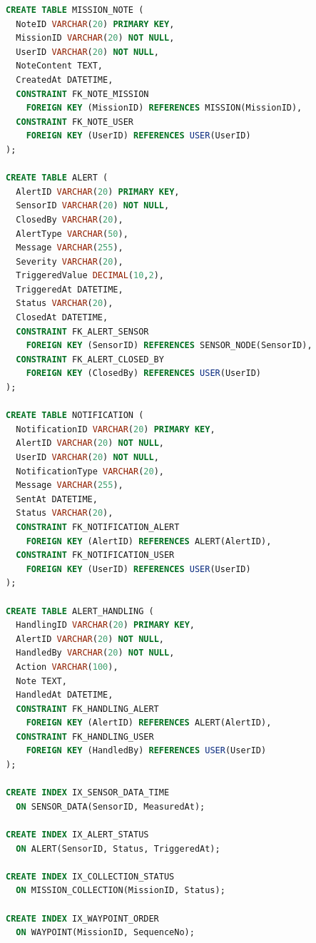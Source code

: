 \begin{lstlisting}[language=SQL]
CREATE TABLE MISSION_NOTE (
  NoteID VARCHAR(20) PRIMARY KEY,
  MissionID VARCHAR(20) NOT NULL,
  UserID VARCHAR(20) NOT NULL,
  NoteContent TEXT,
  CreatedAt DATETIME,
  CONSTRAINT FK_NOTE_MISSION
    FOREIGN KEY (MissionID) REFERENCES MISSION(MissionID),
  CONSTRAINT FK_NOTE_USER
    FOREIGN KEY (UserID) REFERENCES USER(UserID)
);

CREATE TABLE ALERT (
  AlertID VARCHAR(20) PRIMARY KEY,
  SensorID VARCHAR(20) NOT NULL,
  ClosedBy VARCHAR(20),
  AlertType VARCHAR(50),
  Message VARCHAR(255),
  Severity VARCHAR(20),
  TriggeredValue DECIMAL(10,2),
  TriggeredAt DATETIME,
  Status VARCHAR(20),
  ClosedAt DATETIME,
  CONSTRAINT FK_ALERT_SENSOR
    FOREIGN KEY (SensorID) REFERENCES SENSOR_NODE(SensorID),
  CONSTRAINT FK_ALERT_CLOSED_BY
    FOREIGN KEY (ClosedBy) REFERENCES USER(UserID)
);

CREATE TABLE NOTIFICATION (
  NotificationID VARCHAR(20) PRIMARY KEY,
  AlertID VARCHAR(20) NOT NULL,
  UserID VARCHAR(20) NOT NULL,
  NotificationType VARCHAR(20),
  Message VARCHAR(255),
  SentAt DATETIME,
  Status VARCHAR(20),
  CONSTRAINT FK_NOTIFICATION_ALERT
    FOREIGN KEY (AlertID) REFERENCES ALERT(AlertID),
  CONSTRAINT FK_NOTIFICATION_USER
    FOREIGN KEY (UserID) REFERENCES USER(UserID)
);

CREATE TABLE ALERT_HANDLING (
  HandlingID VARCHAR(20) PRIMARY KEY,
  AlertID VARCHAR(20) NOT NULL,
  HandledBy VARCHAR(20) NOT NULL,
  Action VARCHAR(100),
  Note TEXT,
  HandledAt DATETIME,
  CONSTRAINT FK_HANDLING_ALERT
    FOREIGN KEY (AlertID) REFERENCES ALERT(AlertID),
  CONSTRAINT FK_HANDLING_USER
    FOREIGN KEY (HandledBy) REFERENCES USER(UserID)
);

CREATE INDEX IX_SENSOR_DATA_TIME
  ON SENSOR_DATA(SensorID, MeasuredAt);

CREATE INDEX IX_ALERT_STATUS
  ON ALERT(SensorID, Status, TriggeredAt);

CREATE INDEX IX_COLLECTION_STATUS
  ON MISSION_COLLECTION(MissionID, Status);

CREATE INDEX IX_WAYPOINT_ORDER
  ON WAYPOINT(MissionID, SequenceNo);
\end{lstlisting}
